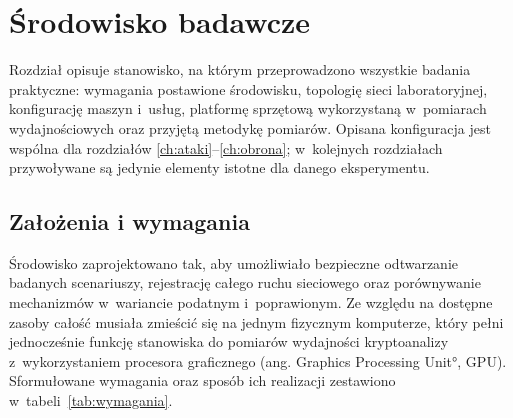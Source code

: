 \chapter{Środowisko badawcze}\label{ch:srodowisko}

Rozdział opisuje stanowisko, na którym przeprowadzono wszystkie badania praktyczne: wymagania postawione środowisku, topologię sieci laboratoryjnej, konfigurację maszyn i~usług, platformę sprzętową wykorzystaną w~pomiarach wydajnościowych oraz przyjętą metodykę pomiarów. Opisana konfiguracja jest wspólna dla rozdziałów \ref{ch:ataki}--\ref{ch:obrona}; w~kolejnych rozdziałach przywoływane są jedynie elementy istotne dla danego eksperymentu.

\section{Założenia i wymagania}\label{sec:wymagania}

Środowisko zaprojektowano tak, aby umożliwiało bezpieczne odtwarzanie badanych scenariuszy, rejestrację całego ruchu sieciowego oraz porównywanie mechanizmów w~wariancie podatnym i~poprawionym. Ze względu na dostępne zasoby całość musiała zmieścić się na jednym fizycznym komputerze, który pełni jednocześnie funkcję stanowiska do pomiarów wydajności kryptoanalizy z~wykorzystaniem procesora graficznego (ang. \ang{Graphics Processing Unit}, GPU). Sformułowane wymagania oraz sposób ich realizacji zestawiono w~tabeli~\ref{tab:wymagania}.


